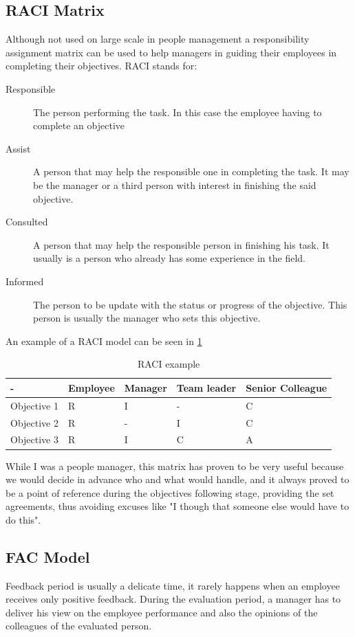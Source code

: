 \subsection{RACI Matrix}
\label{sub-sec:raci}
Although not used on large scale in people management a responsibility assignment matrix can be used to help managers in guiding their employees in completing their objectives.
RACI stands for:
\begin{description}
\item[Responsible] The person performing the task. In this case the employee having to complete an objective
\item[Assist] A person that may help the responsible one in completing the task. It may be the manager or a third person with interest in finishing the said objective.
\item[Consulted] A person that may help the responsible person in finishing his task. It usually is a person who already has some experience in the field.
\item[Informed] The person to be update with the status or progress of the objective. This person is usually the manager who sets this objective.
\end{description}
An example of a RACI model can be seen in \cref{table:raciex}
\begin{table}[h]
  \centering
  \caption{RACI example}
  \setlength\tabcolsep{3.8pt}
  \setlength\extrarowheight{1pt}
    \begin{tabular}{ | l | l | l | l | p{3cm} |}
    \hline
    - & Employee & Manager & Team leader & Senior Colleague \\ \hline
    Objective 1 & R & I & - & C \\ \hline
    Objective 2 & R & - & I & C \\ \hline
    Objective 3 & R & I & C & A \\ \hline
    \end{tabular}
    \label{table:raciex}
\end{table}

While I was a people manager, this matrix has proven to be very useful because we would decide in advance who and what would handle, and it always proved to be a point of reference during the objectives following stage, providing the set agreements, thus avoiding excuses like "I though that someone else would have to do this".
\subsection{FAC Model}
\label{sub-sec:fac}
Feedback period is usually a delicate time, it rarely happens when an employee receives only positive feedback. During the evaluation period, a manager has to deliver his view on the employee performance and also the opinions of the colleagues of the evaluated person. 

